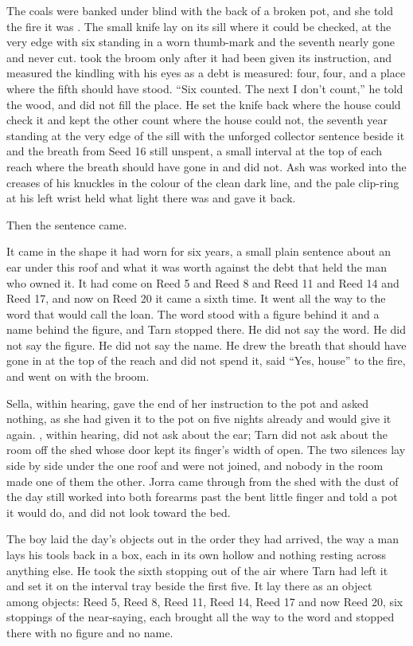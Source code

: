 The coals were banked under blind  with the back of a broken pot, and she told the fire it was . The small knife lay on its sill where it could be checked, at the very edge with six standing in a worn thumb-mark and the seventh nearly gone and never cut.  took the broom only after it had been given its instruction, and measured the kindling with his eyes as a debt is measured: four, four, and a place where the fifth should have stood. “Six counted. The next I don't count,” he told the wood, and did not fill the place. He set the knife back where the house could check it and kept the other count where the house could not, the seventh year standing at the very edge of the sill with the unforged collector sentence beside it and the breath from Seed 16 still unspent, a small interval at the top of each reach where the breath should have gone in and did not. Ash was worked into the creases of his knuckles in the colour of the clean dark line, and the pale clip-ring at his left wrist held what light there was and gave it back.

Then the sentence came.

It came in the shape it had worn for six years, a small plain sentence about an ear under this roof and what it was worth against the debt that held the man who owned it. It had come on Reed 5 and Reed 8 and Reed 11 and Reed 14 and Reed 17, and now on Reed 20 it came a sixth time. It went all the way to the word that would call the loan. The word stood with a figure behind it and a name behind the figure, and Tarn stopped there. He did not say the word. He did not say the figure. He did not say the name. He drew the breath that should have gone in at the top of the reach and did not spend it, said “Yes, house” to the fire, and went on with the broom.

Sella, within hearing, gave the end of her instruction to the pot and asked nothing, as she had given it to the pot on five nights already and would give it again. , within hearing, did not ask about the ear; Tarn did not ask about the room off the shed whose door kept its finger's width of open. The two silences lay side by side under the one roof and were not joined, and nobody in the room made one of them the other. Jorra came through from the shed with the dust of the day still worked into both forearms past the bent little finger and told a pot it would do, and did not look toward the bed.

The boy laid the day's objects out in the order they had arrived, the way a man lays his tools back in a box, each in its own hollow and nothing resting across anything else. He took the sixth stopping out of the air where Tarn had left it and set it on the interval tray beside the first five. It lay there as an object among objects: Reed 5, Reed 8, Reed 11, Reed 14, Reed 17 and now Reed 20, six stoppings of the near-saying, each brought all the way to the word and stopped there with no figure and no name.

